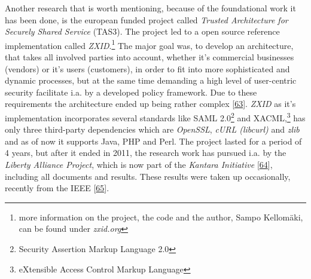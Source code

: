 \documentclass[12pt,english,a4paper,titlepage,cleardoublepage=empty,dottedtoc]{report}
\begin{document}
Another research that is worth mentioning, because of the foundational
work it has been done, is the european funded project called
\emph{Trusted Architecture for Securely Shared Service} (TAS3). The
project led to a open source reference implementation called
\emph{ZXID}.\footnote{more information on the project, the code and the
  author, Sampo Kellomäki, can be found under \emph{zxid.org}} The major
goal was, to develop an architecture, that takes all involved parties
into account, whether it's commercial businesses (vendors) or it's users
(customers), in order to fit into more sophisticated and dynamic
processes, but at the same time demanding a high level of user-centric
security facilitate i.a. by a developed policy framework. Due to these
requirements the architecture ended up being rather complex
{[}\protect\hyperlink{ref-graphic_2011_architecture_components-of-organization-domain}{63}{]}.
\emph{ZXID} as it's implementation incorporates several standards like
SAML 2.0\footnote{Security Assertion Markup Language 2.0} and
XACML,\footnote{eXtensible Access Control Markup Language} has only
three third-party dependencies which are \emph{OpenSSL}, \emph{cURL
(libcurl)} and \emph{zlib} and as of now it supports Java, PHP and Perl.
The project lasted for a period of 4 years, but after it ended in 2011,
the research work has pursued i.a. by the \emph{Liberty Alliance
Project}, which is now part of the \emph{Kantara Initiative}
{[}\protect\hyperlink{ref-web_kantara-initiative}{64}{]}, including all
documents and results. These results were taken up occasionally,
recently from the IEEE
{[}\protect\hyperlink{ref-paper_2014_personal-data-store-approach}{65}{]}.
\end{document}
